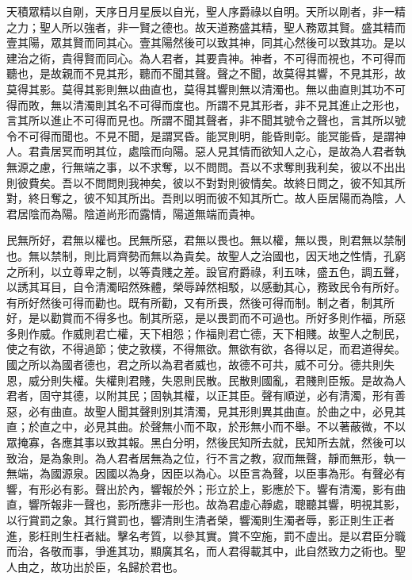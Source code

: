 天積眾精以自剛，天序日月星辰以自光，聖人序爵祿以自明。天所以剛者，非一精之力；聖人所以強者，非一賢之德也。故天道務盛其精，聖人務眾其賢。盛其精而壹其陽，眾其賢而同其心。壹其陽然後可以致其神，同其心然後可以致其功。是以建治之術，貴得賢而同心。為人君者，其要貴神。神者，不可得而視也，不可得而聽也，是故親而不見其形，聽而不聞其聲。聲之不聞，故莫得其響，不見其形，故莫得其影。莫得其影則無以曲直也，莫得其響則無以清濁也。無以曲直則其功不可得而敗，無以清濁則其名不可得而度也。所謂不見其形者，非不見其進止之形也，言其所以進止不可得而見也。所謂不聞其聲者，非不聞其號令之聲也，言其所以號令不可得而聞也。不見不聞，是謂冥昏。能冥則明，能昏則彰。能冥能昏，是謂神人。君貴居冥而明其位，處陰而向陽。惡人見其情而欲知人之心，是故為人君者執無源之慮，行無端之事，以不求奪，以不問問。吾以不求奪則我利矣，彼以不出出則彼費矣。吾以不問問則我神矣，彼以不對對則彼情矣。故終日問之，彼不知其所對，終日奪之，彼不知其所出。吾則以明而彼不知其所亡。故人臣居陽而為陰，人君居陰而為陽。陰道尚形而露情，陽道無端而貴神。


民無所好，君無以權也。民無所惡，君無以畏也。無以權，無以畏，則君無以禁制也。無以禁制，則比肩齊勢而無以為貴矣。故聖人之治國也，因天地之性情，孔窮之所利，以立尊卑之制，以等貴賤之差。設官府爵祿，利五味，盛五色，調五聲，以誘其耳目，自令清濁昭然殊體，榮辱踔然相駁，以感動其心，務致民令有所好。有所好然後可得而勸也。既有所勸，又有所畏，然後可得而制。制之者，制其所好，是以勸賞而不得多也。制其所惡，是以畏罰而不可過也。所好多則作福，所惡多則作威。作威則君亡權，天下相怨；作福則君亡德，天下相賤。故聖人之制民，使之有欲，不得過節；使之敦樸，不得無欲。無欲有欲，各得以足，而君道得矣。國之所以為國者德也，君之所以為君者威也，故德不可共，威不可分。德共則失恩，威分則失權。失權則君賤，失恩則民散。民散則國亂，君賤則臣叛。是故為人君者，固守其德，以附其民；固執其權，以正其臣。聲有順逆，必有清濁，形有善惡，必有曲直。故聖人聞其聲則別其清濁，見其形則異其曲直。於曲之中，必見其直；於直之中，必見其曲。於聲無小而不取，於形無小而不舉。不以著蔽微，不以眾掩寡，各應其事以致其報。黑白分明，然後民知所去就，民知所去就，然後可以致治，是為象則。為人君者居無為之位，行不言之教，寂而無聲，靜而無形，執一無端，為國源泉。因國以為身，因臣以為心。以臣言為聲，以臣事為形。有聲必有響，有形必有影。聲出於內，響報於外；形立於上，影應於下。響有清濁，影有曲直，響所報非一聲也，影所應非一形也。故為君虛心靜處，聰聽其響，明視其影，以行賞罰之象。其行賞罰也，響清則生清者榮，響濁則生濁者辱，影正則生正者進，影枉則生枉者絀。擊名考質，以參其實。賞不空施，罰不虛出。是以君臣分職而治，各敬而事，爭進其功，顯廣其名，而人君得載其中，此自然致力之術也。聖人由之，故功出於臣，名歸於君也。


